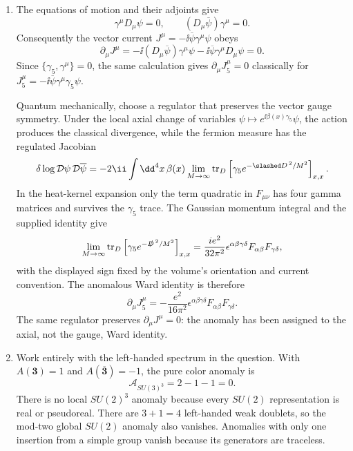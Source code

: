 \begin{enumerate}
\begin{enumerate}
    \item[(b)]
    The equations of motion and their adjoints give
    \[
      \gamma^\mu D_\mu\psi=0,\qquad
      (D_\mu\overline\psi)\gamma^\mu=0.
    \]
    Consequently the vector current
    \(J^\mu=-\ii\overline\psi\gamma^\mu\psi\) obeys
    \[
      \partial_\mu J^\mu
       =-\ii(D_\mu\overline\psi)\gamma^\mu\psi
        -\ii\overline\psi\gamma^\mu D_\mu\psi=0.
    \]
    Since \(\{\gamma_5,\gamma^\mu\}=0\), the same calculation gives
    \(\partial_\mu J_5^\mu=0\) classically for
    \(J_5^\mu=-\ii\overline\psi\gamma^\mu\gamma_5\psi\).

    Quantum mechanically, choose a regulator that preserves the vector
    gauge symmetry.  Under the local axial change of variables
    \(\psi\mapsto e^{\ii\beta(x)\gamma_5}\psi\), the action produces the
    classical divergence, while the fermion measure has the regulated
    Jacobian
    \[
      \delta\log\mathcal D\psi\,\mathcal D\overline\psi
       =-2\ii\int \dd^4x\,\beta(x)
        \lim_{M\to\infty}
        \operatorname{tr}_{D}
        \left[\gamma_5e^{-\slashed D^{\,2}/M^2}\right]_{x,x}.
    \]
    In the heat-kernel expansion only the term quadratic in
    \(F_{\mu\nu}\) has four gamma matrices and survives the
    \(\gamma_5\) trace.  The Gaussian momentum integral and the supplied
    identity give
    \[
      \lim_{M\to\infty}
        \operatorname{tr}_{D}
        \left[\gamma_5e^{-\slashed D^{\,2}/M^2}\right]_{x,x}
       =\frac{ie^2}{32\pi^2}
        \epsilon^{\alpha\beta\gamma\delta}
        F_{\alpha\beta}F_{\gamma\delta},
    \]
    with the displayed sign fixed by the volume's orientation and current
    convention.  The anomalous Ward identity is therefore
    \[
      \boxed{\partial_\mu J_5^\mu
       =-\frac{e^2}{16\pi^2}
        \epsilon^{\alpha\beta\gamma\delta}
        F_{\alpha\beta}F_{\gamma\delta}.}
    \]
    The same regulator preserves
    \(\partial_\mu J^\mu=0\): the anomaly has been assigned to the axial,
    not the gauge, Ward identity.

    \item[(c)]
    Work entirely with the left-handed spectrum in the question.  With
    \(A(\mathbf3)=1\) and
    \(A(\overline{\mathbf3})=-1\), the pure color anomaly is
    \[
      \mathcal A_{SU(3)^3}=2-1-1=0.
    \]
    There is no local \(SU(2)^3\) anomaly because every \(SU(2)\)
    representation is real or pseudoreal.  There are
    \(3+1=4\) left-handed weak doublets, so the mod-two global
    \(SU(2)\) anomaly also vanishes.  Anomalies with only one insertion
    from a simple group vanish because its generators are traceless.


\end{enumerate}
\end{enumerate}
